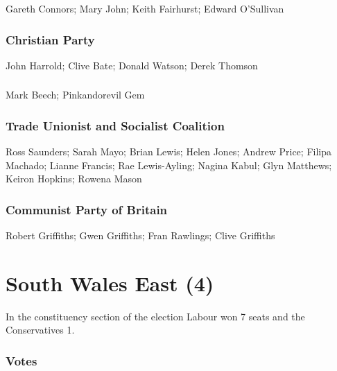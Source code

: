 \begin{resultsiii}
Gareth Connors; Mary John; Keith Fairhurst; Edward O'Sullivan

\subsubsection*{Christian Party}

John Harrold; Clive Bate; Donald Watson; Derek Thomson

\subsubsection*{}

Mark Beech; Pinkandorevil Gem

\subsubsection*{Trade Unionist and Socialist Coalition}

Ross Saunders; Sarah Mayo; Brian Lewis; Helen Jones; Andrew Price; Filipa Machado; Lianne Francis; Rae Lewis-Ayling; Nagina Kabul; Glyn Matthews; Keiron Hopkins; Rowena Mason

\subsubsection*{Communist Party of Britain}

Robert Griffiths; Gwen Griffiths; Fran Rawlings; Clive Griffiths

\end{resultsiii}

\vfill

\section[South Wales East]{South Wales East (4)}

In the constituency section of the election Labour won 7 seats and the Conservatives 1.

\subsubsection*{Votes}

